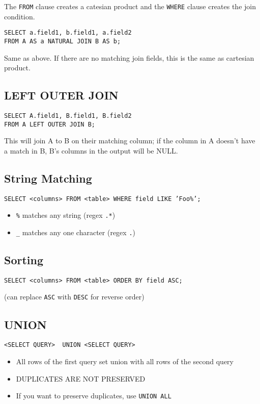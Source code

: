 \documentclass[11pt]{article}
\begin{document}
The \texttt{FROM} clause creates a catesian product and the \texttt{WHERE} clause creates
the join condition. 

\begin{verbatim}
SELECT a.field1, b.field1, a.field2
FROM A AS a NATURAL JOIN B AS b;
\end{verbatim}

Same as above. If there are no matching join fields, this is the same as
cartesian product.
\subsection{LEFT OUTER JOIN}
\label{sec:org7e06efb}
\begin{verbatim}
SELECT A.field1, B.field1, B.field2
FROM A LEFT OUTER JOIN B;
\end{verbatim}

This will join A to B on their matching column; if the column in A doesn't
have a match in B, B's columns in the output will be NULL.
\subsection{String Matching}
\label{sec:org71dc14f}
\texttt{SELECT <columns> FROM <table> WHERE field LIKE 'Foo\%';}

\begin{itemize}
\item \texttt{\%} matches any string (regex \texttt{.*})
\item \texttt{\_} matches any one character (regex \texttt{.})
\end{itemize}
\subsection{Sorting}
\label{sec:org9536da3}
\texttt{SELECT <columns> FROM <table> ORDER BY field ASC;}

(can replace \texttt{ASC} with \texttt{DESC} for reverse order)
\subsection{UNION}
\label{sec:org991e710}
\begin{verbatim}
<SELECT QUERY>  UNION <SELECT QUERY>
\end{verbatim}

\begin{itemize}
\item All rows of the first query set union with all rows of the second query
\item DUPLICATES ARE NOT PRESERVED
\item If you want to preserve duplicates, use \texttt{UNION ALL}
\end{itemize}
\end{document}
